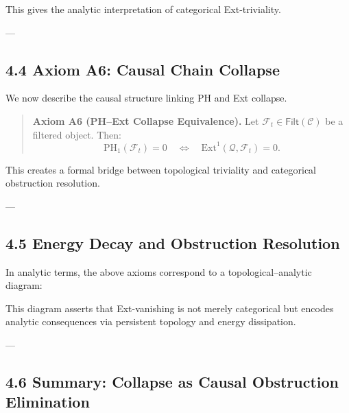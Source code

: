 \documentclass[11pt]{article}
\begin{document}
This gives the analytic interpretation of categorical Ext-triviality.

---

\subsection*{4.4 Axiom A6: Causal Chain Collapse}

We now describe the causal structure linking PH and Ext collapse.

\begin{quote}
\textbf{Axiom A6 (PH–Ext Collapse Equivalence).}  
Let \( \mathcal{F}_t \in \mathsf{Filt}(\mathcal{C}) \) be a filtered object. Then:
\[
\mathrm{PH}_1(\mathcal{F}_t) = 0 
\quad \Longleftrightarrow \quad 
\mathrm{Ext}^1(\mathcal{Q}, \mathcal{F}_t) = 0.
\]
\end{quote}

This creates a formal bridge between topological triviality and categorical obstruction resolution.

---

\subsection*{4.5 Energy Decay and Obstruction Resolution}

In analytic terms, the above axioms correspond to a topological–analytic diagram:


This diagram asserts that Ext-vanishing is not merely categorical but encodes analytic consequences  
via persistent topology and energy dissipation.

---

\subsection*{4.6 Summary: Collapse as Causal Obstruction Elimination}
\end{document}
